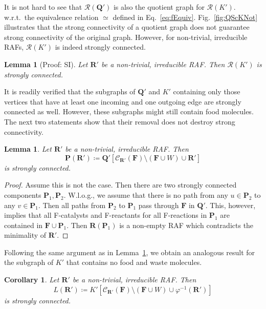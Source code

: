 \documentclass[pdflatex]{sn-jnl}
\theoremstyle{thmstyleone}%
\newtheorem{corollary}[theorem]{Corollary}%
\newtheorem{lemma}[theorem]{Lemma}%
\theoremstyle{examplesty}%
\theoremstyle{thmstylethree}%
\newcommand{\king}{K}
\newcommand{\queen}{\mathbf{Q}}
\newcommand{\princess}{\mathbf{P}}
\newcommand{\lord}{L}
\newcommand{\food}{\ensuremath{\mathbf{F}}}
\newcommand{\closure}[2]{\mathscr{C}_{#1}(#2)}
\newcommand{\FR}[0]{\mathbf{R}}
\newcommand{\RGraph}[0]{\mathcal{R}}
\newcommand{\RAF}[0]{\mathbf{R}'}
\newcommand{\holy}[1]{\begingroup\color{royalpurple}#1\endgroup}
\begin{document}
It is not hard to see that $\RGraph(\queen')$ is also the quotient graph
for $\RGraph(\king')$. \holy{w.r.t.\ the equivalence relation $\simeq$ 
defined in Eq.~\ref{eq:fEquiv}.}
Fig.~\ref{fig:QScKNot} illustrates that the strong
connectivity of a quotient graph does not guarantee strong connectivity of
the original graph. However, for non-trivial, irreducible RAFs,
$\RGraph(\king')$ is indeed strongly connected.
\vspace{6pt}
\begin{lemma}[Proof: SI]\label{lem:KSC}
  Let $\RAF$ be a non-trivial, irreducible RAF. Then $\RGraph(\king')$ is
  strongly connected.
\end{lemma}
\vspace{6pt}
%
It is readily verified that the subgraphs of $\queen'$ and $\king'$
containing only those vertices that have at least one incoming and one
outgoing edge are strongly connected as well. However, these subgraphs
might still contain food molecules. The next two statements show that their
removal does not destroy strong connectivity.
\vspace{6pt}
\begin{lemma}\label{lem:PSC}
  Let $\RAF$ be a non-trivial, irreducible RAF. Then 
  \begin{equation}\label{eq:PrinceGraph}
    \princess(\RAF) \coloneqq
    \queen'[\closure{\RAF}{\food}\setminus (\food\cup W) \cup \RAF]
  \end{equation}
  is strongly connected.
\end{lemma}
\begin{proof}
  Assume this is not the case. Then there are two strongly connected
  components $\princess_1,\princess_2$.  W.l.o.g., we assume that there is
  no path from any $u\in \princess_2$ to any $v\in \princess_1$. Then all
  paths from $\princess_2$ to $\princess_1$ pass through $\food$ in
  $\queen'$. This, however, implies that all F-catalysts and F-reactants
  for all F-reactions in $\princess_1$ are contained in $\food\cup
  \princess_1$. Then $\FR(\princess_1)$ is a non-empty RAF which
  contradicts the minimality of $\RAF$.
\end{proof}	
\vspace{6pt}

Following the same argument as in Lemma~\ref{lem:PSC}, we obtain an
analogous result for the subgraph of $\king'$ that contains no food and
waste molecules.
\vspace{6pt}
\begin{corollary}
  Let $\RAF$ be a non-trivial, irreducible RAF. Then 
  \begin{equation}\label{eq:PrinceGraph}
    \lord(\RAF) \coloneqq
    \king'[\closure{\RAF}{\food}\setminus
      (\food\cup W) \cup \varphi^{-1}(\RAF)]
  \end{equation}
  is strongly connected.
\end{corollary}
\vspace{6pt}
\end{document}
